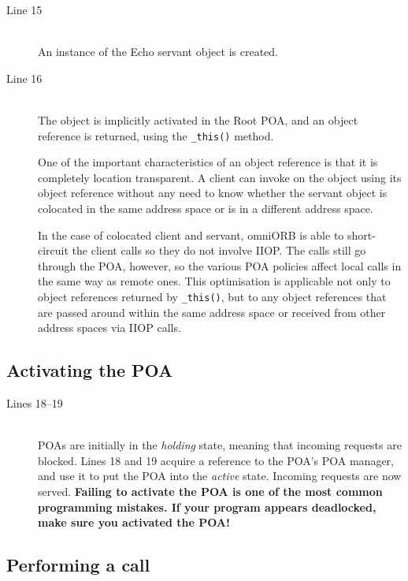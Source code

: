 \documentclass[draft,11pt,twoside,a4paper]{book}
\newcommand{\op}[1]{\texttt{#1()}}
\newcommand{\term}[1]{\textit{#1}}
\begin{document}
\begin{description}

\item[Line 15]\mbox{}\\
%
An instance of the Echo servant object is created.

\item[Line 16]\mbox{}\\
%
The object is implicitly activated in the Root POA, and an object
reference is returned, using the \op{\_this} method.

One of the important characteristics of an object reference is that it
is completely location transparent. A client can invoke on the object
using its object reference without any need to know whether the
servant object is colocated in the same address space or is in a
different address space.

In the case of colocated client and servant, omniORB is able to
short-circuit the client calls so they do not involve IIOP. The calls
still go through the POA, however, so the various POA policies affect
local calls in the same way as remote ones. This optimisation is
applicable not only to object references returned by \op{\_this}, but
to any object references that are passed around within the same
address space or received from other address spaces via IIOP calls.

\end{description}


\subsection{Activating the POA}

\begin{description}

\item[Lines 18--19]\mbox{}\\
%
POAs are initially in the \term{holding} state, meaning that incoming
requests are blocked. Lines 18 and 19 acquire a reference to the POA's
POA manager, and use it to put the POA into the \term{active} state.
Incoming requests are now served. \textbf{Failing to activate the POA
is one of the most common programming mistakes. If your program
appears deadlocked, make sure you activated the POA!}

\end{description}


\subsection{Performing a call}
\end{document}
